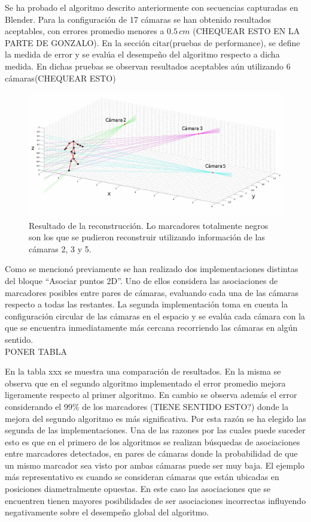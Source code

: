 Se ha probado el algoritmo descrito anteriormente con secuencias capturadas en Blender. Para la configuración de 17 cámaras se han obtenido resultados aceptables,  con errores promedio menores a $0.5\,cm$ (CHEQUEAR ESTO EN LA PARTE DE GONZALO). En la sección citar(pruebas de performance), se define la medida de error  y se evalúa el desempeño del algoritmo respecto a dicha medida. En dichas pruebas se observan resultados aceptables aún utilizando 6 cámaras(CHEQUEAR ESTO)

\begin{figure}[h!]
\centering
\captionsetup{justification=centering,margin=2.8cm}
\includegraphics[scale=0.5]{img/Reconstruccion/Reconstruccion_3_camaras2.jpg}
\caption{Resultado de la reconstrucción. Lo marcadores totalmente negros son los que se pudieron reconstruir utilizando información de las cámaras 2, 3 y 5.}
\end{figure}


Como se mencionó previamente se han realizado dos implementaciones distintas del bloque  “Asociar puntos 2D”. Uno de ellos considera las asociaciones de marcadores posibles entre pares de cámaras, evaluando cada una de las cámaras respecto a todas las restantes.  La segunda implementación toma en cuenta  la configuración circular de las cámaras en el espacio y se evalúa cada cámara con la que se encuentra inmediatamente más cercana  recorriendo las cámaras en algún sentido.\\

PONER TABLA


En la tabla xxx se muestra una comparación de resultados. En la misma se observa que en el segundo algoritmo implementado el error promedio mejora ligeramente respecto al primer algoritmo. En cambio se observa además  el error considerando el 99\% de los marcadores (TIENE SENTIDO ESTO?) donde la mejora del segundo algoritmo es más significativa. Por esta razón se ha elegido las segunda de las implementaciones.
Una de las razones por las cuales puede suceder esto es que en el primero de los algoritmos se realizan búsquedas de asociaciones entre marcadores detectados, en pares de cámaras donde la probabilidad de que un mismo marcador sea visto por ambas cámaras  puede ser muy baja. El ejemplo más representativo es cuando se consideran cámaras que están  ubicadas en posiciones diametralmente opuestas. En este caso las asociaciones que se encuentren tienen mayores posibilidades de ser asociaciones incorrectas influyendo negativamente sobre el desempeño global del algoritmo. 



